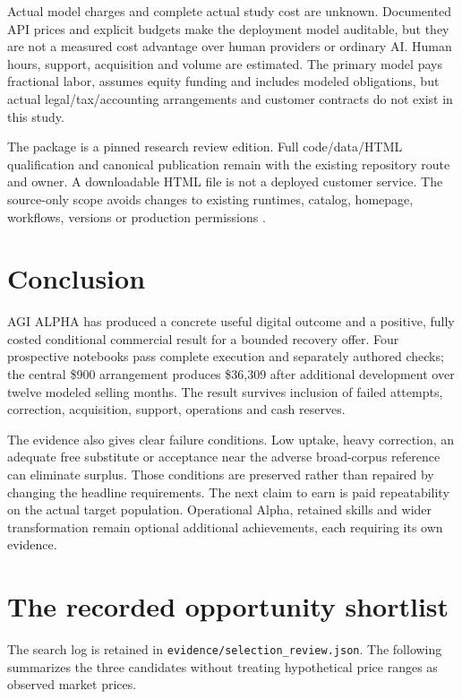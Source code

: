 Actual model charges and complete actual study cost are unknown. Documented API prices and explicit budgets make the deployment model auditable, but they are not a measured cost advantage over human providers or ordinary AI. Human hours, support, acquisition and volume are estimated. The primary model pays fractional labor, assumes equity funding and includes modeled obligations, but actual legal/tax/accounting arrangements and customer contracts do not exist in this study.

The package is a pinned research review edition. Full code/data/HTML qualification and canonical publication remain with the existing repository route and owner. A downloadable HTML file is not a deployed customer service. The source-only scope avoids changes to existing runtimes, catalog, homepage, workflows, versions or production permissions \citep{publication}.

\section{Conclusion}
AGI ALPHA has produced a concrete useful digital outcome and a positive, fully costed conditional commercial result for a bounded recovery offer. Four prospective notebooks pass complete execution and separately authored checks; the central \$900 arrangement produces \$36,309 after additional development over twelve modeled selling months. The result survives inclusion of failed attempts, correction, acquisition, support, operations and cash reserves.

The evidence also gives clear failure conditions. Low uptake, heavy correction, an adequate free substitute or acceptance near the adverse broad-corpus reference can eliminate surplus. Those conditions are preserved rather than repaired by changing the headline requirements. The next claim to earn is paid repeatability on the actual target population. Operational Alpha, retained skills and wider transformation remain optional additional achievements, each requiring its own evidence.

\clearpage
\appendix
\section{The recorded opportunity shortlist}\label{app:shortlist}
The search log is retained in \texttt{evidence/selection\_review.json}. The following summarizes the three candidates without treating hypothetical price ranges as observed market prices.

